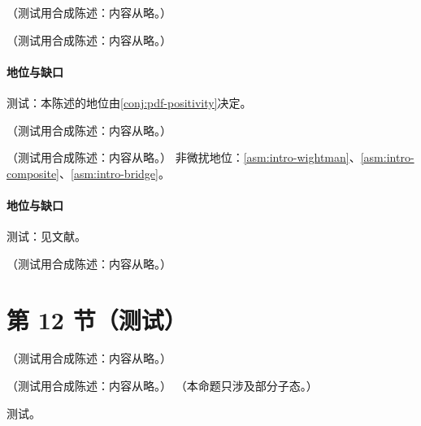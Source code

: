 \begin{remark}[次领头幂次的幂律快度发散]\label{rem:front-power-rapidity}
（测试用合成陈述：内容从略。）
\end{remark}

\begin{proposition}\label{prop:front-msbar-negative}
（测试用合成陈述：内容从略。）
\end{proposition}
\paragraph{地位与缺口}测试：本陈述的地位由\cref{conj:pdf-positivity}决定。

\begin{example}\label{ex:front-yukawa}
（测试用合成陈述：内容从略。）
\end{example}

\begin{proposition}\label{prop:front-positivity-large-scale}
（测试用合成陈述：内容从略。）
非微扰地位：\cref{asm:intro-wightman}、\cref{asm:intro-composite}、\cref{asm:intro-bridge}。
\end{proposition}
\paragraph{地位与缺口}测试：见文献。

\begin{remark}[对本书与拟合的后果]\label{rem:front-positivity-tracks}
（测试用合成陈述：内容从略。）
\end{remark}

\section{第 12 节（测试）}\label{sec:front-dps}

\begin{remark}\label{rem:front-k-gluon}
（测试用合成陈述：内容从略。）
\end{remark}

\begin{proposition}\label{prop:front-brst-bilocal}
（测试用合成陈述：内容从略。）
（本命题只涉及部分子态。）
\end{proposition}
\begin{proofsketch}测试。\end{proofsketch}
